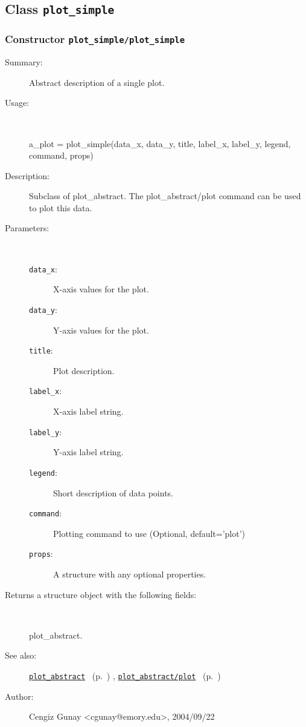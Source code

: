 \subsection{Class \texttt{plot\_simple}}%
%
\label{ref_plot_simple}%
\hypertarget{ref_plot_simple}{}%
\subsubsection[Constructor \texttt{plot\_simple}]{Constructor \texttt{plot\_simple/plot\_simple}}%
%
\label{ref_plot_simple__plot_simple}%
\hypertarget{ref_plot_simple__plot_simple}{}%
\begin{description}
\item[Summary:]Abstract description of a single plot.
%
\item[Usage:]~%
\begin{lyxcode}%
a\_plot = plot\_simple(data\_x, data\_y, title, 
		       label\_x, label\_y, legend, command, props)
%
\end{lyxcode}%
%
\item[Description:]%
Subclass of plot\_abstract. The plot\_abstract/plot command can be used to
 plot this data.
\item[Parameters:]~
\begin{description}%
\item[\texttt{data\_x}:]
 X-axis values for the plot.
\item[\texttt{data\_y}:]
 Y-axis values for the plot.
\item[\texttt{title}:]
 Plot description.
\item[\texttt{label\_x}:]
 X-axis label string.
\item[\texttt{label\_y}:]
 Y-axis label string.
\item[\texttt{legend}:]
 Short description of data points.
\item[\texttt{command}:]
 Plotting command to use (Optional, default='plot')
\item[\texttt{props}:]
 A structure with any optional properties.
\end{description}%
%
\item[Returns a structure object with the following fields:]~

	plot\_abstract.
%
%
\item[See also:]%
\hyperlink{ref_plot_abstract}{\texttt{plot\_abstract}}%
\ (p.~\pageref{ref_plot_abstract})%
%
, \hyperlink{ref_plot_abstract__plot}{\texttt{plot\_abstract/plot}}%
\ (p.~\pageref{ref_plot_abstract__plot})%
%
%
\item[Author:]%
Cengiz Gunay <cgunay@emory.edu>, 2004/09/22%
\end{description}
\methodline%
